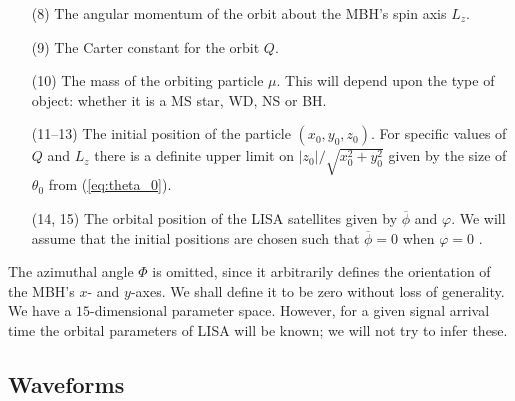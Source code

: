 \documentclass[useAMS,usedcolumn,usegraphicx,usenatbib]{mn2e}
\newcommand{\eqnref}[1]{(\ref{eq:#1})}
\begin{document}
\begin{enumerate}
\item[(8)] The angular momentum of the orbit about the MBH's spin axis $L_z$.
\item[(9)] The Carter constant for the orbit $Q$.
\item[(10)] The mass of the orbiting particle $\mu$. This will depend upon the type of object: whether it is a MS star, WD, NS or BH.
\item[(11--13)] The initial position of the particle $(x_0, y_0, z_0)$. For specific values of $Q$ and $L_z$ there is a definite upper limit on $|z_0|/\sqrt{x_0^2+y_0^2}$ given by the size of $\theta_0$ from \eqnref{theta_0}.
\item[(14, 15)] The orbital position of the LISA satellites given by $\overline{\phi}$ and $\varphi$. We will assume that the initial positions are chosen such that $\overline{\phi} = 0$ when $\varphi = 0$ \citep{Cutler1998}.\\
\end{enumerate}%
The azimuthal angle $\Phi$ is omitted, since it arbitrarily defines the orientation of the MBH's $x$- and $y$-axes. We shall define it to be zero without loss of generality. We have a $15$-dimensional parameter space. However, for a given signal arrival time the orbital parameters of LISA will be known; we will not try to infer these.

\subsection{Waveforms}
\end{document}
